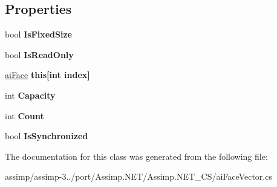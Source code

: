 \subsection*{Properties}
\begin{DoxyCompactItemize}
\item 
\hypertarget{classai_face_vector_ab33b22908b43a0fa124586f7b4e8eae4}{bool {\bfseries Is\+Fixed\+Size}}\label{classai_face_vector_ab33b22908b43a0fa124586f7b4e8eae4}

\item 
\hypertarget{classai_face_vector_acb31a8a36cb79abbe3adc3183e1bb402}{bool {\bfseries Is\+Read\+Only}}\label{classai_face_vector_acb31a8a36cb79abbe3adc3183e1bb402}

\item 
\hypertarget{classai_face_vector_aaf864a8ba9a55ccb86ce649b1a7164ad}{\hyperlink{structai_face}{ai\+Face} {\bfseries this\mbox{[}int index\mbox{]}}}\label{classai_face_vector_aaf864a8ba9a55ccb86ce649b1a7164ad}

\item 
\hypertarget{classai_face_vector_af949d3bea1d0d73d58c7ddd6dc42adac}{int {\bfseries Capacity}}\label{classai_face_vector_af949d3bea1d0d73d58c7ddd6dc42adac}

\item 
\hypertarget{classai_face_vector_a1fb16bae38de3e90eddc7586b2e16865}{int {\bfseries Count}}\label{classai_face_vector_a1fb16bae38de3e90eddc7586b2e16865}

\item 
\hypertarget{classai_face_vector_a45b88c34f327e0b2ebd72dec4385b6bf}{bool {\bfseries Is\+Synchronized}}\label{classai_face_vector_a45b88c34f327e0b2ebd72dec4385b6bf}

\end{DoxyCompactItemize}


The documentation for this class was generated from the following file\+:\begin{DoxyCompactItemize}
\item 
assimp/assimp-\/3../port/\+Assimp.\+N\+E\+T/\+Assimp.\+N\+E\+T\+\_\+\+C\+S/ai\+Face\+Vector.\+cs\end{DoxyCompactItemize}
